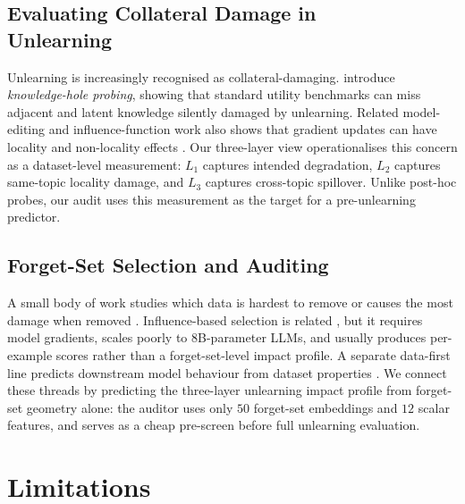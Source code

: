 \documentclass[11pt,a4paper]{article}
\newcommand{\Lone}{L_1}
\newcommand{\Ltwo}{L_2}
\newcommand{\Lthree}{L_3}
\begin{document}
\subsection[Evaluating Collateral Damage in Unlearning]{Evaluating Collateral Damage in\\ Unlearning}
Unlearning is increasingly recognised as collateral-damaging. \citet{ko2025probing}
introduce \emph{knowledge-hole probing}, showing that standard utility
benchmarks can miss adjacent and latent knowledge silently damaged by
unlearning. Related model-editing and influence-function work also shows that
gradient updates can have locality and non-locality effects
\citep{meng2022locating, mitchell2022memory, koh2017understanding,
grosse2023studying}. Our three-layer view operationalises this concern as a
dataset-level measurement: $\Lone$ captures intended degradation, $\Ltwo$
captures same-topic locality damage, and $\Lthree$ captures cross-topic
spillover. Unlike post-hoc probes, our audit uses this measurement as the
target for a pre-unlearning predictor.

\subsection{Forget-Set Selection and Auditing}
A small body of work studies which data is hardest to remove or causes the
most damage when removed \citep{thudi2022unrolling, kurmanji2024towards}.
Influence-based selection is related \citep{koh2017understanding}, but it
requires model gradients, scales poorly to 8B-parameter LLMs, and usually
produces per-example scores rather than a forget-set-level impact profile. A
separate data-first line predicts downstream model behaviour from dataset
properties \citep{dang2024curious, ilyas2022datamodels,
yao2020pyhessian}. We connect these threads by predicting the three-layer
unlearning impact profile from forget-set geometry alone: the auditor uses
only $50$ forget-set embeddings and $12$ scalar features, and serves as a
cheap pre-screen before full unlearning evaluation.

\section{Limitations}
\label{sec:limitations}
\end{document}
